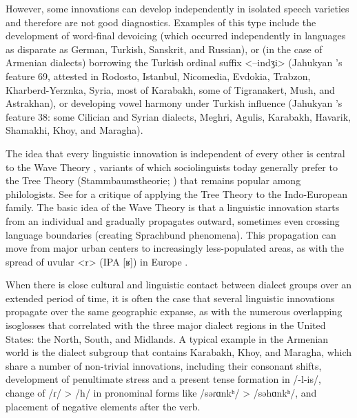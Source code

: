 \documentclass[output=paper]{langscibook}
\begin{document}
However, some innovations can develop independently in isolated speech varieties and therefore are not good diagnostics. Examples of this type include the development of word-final devoicing (which occurred independently in languages as disparate as German, Turkish, Sanskrit, and Russian), or (in the case of Armenian dialects) borrowing the Turkish ordinal suffix <–indʒi> (Jahukyan \citeyear{Jahukyan-1972-ArmenianDiaolectology}'s feature 69, attested in Rodosto, Istanbul, Nicomedia, Evdokia, Trabzon, Kharberd-Yerznka, Syria, most of Karabakh, some of Tigranakert, Mush, and Astrakhan), or developing vowel harmony under Turkish influence (Jahukyan \citeyear{Jahukyan-1972-ArmenianDiaolectology}'s feature 38: some Cilician and Syrian dialects, Meghri, Agulis, Karabakh, Havarik, Shamakhi, Khoy, and Maragha).

The idea that every linguistic innovation is independent of every other is central to the Wave Theory \citep{Schmidt-1872-VerwandtschaftsverhältnisseindogermanischenSprachen}, variants of which sociolinguists today generally prefer to the Tree Theory (Stammbaumstheorie; \citealt{Schleicher-1853-erstenSpaltungenindogermanischenUrvolkes}) that remains popular among philologists.  See \citealt{Garrett-2006-ConvergenceformationIndoEuropeansubgroupsPhylogenychronology} for a critique of applying the Tree Theory to the Indo-European family.  The basic idea of the Wave Theory is that a linguistic innovation starts from an individual and gradually propagates outward, sometimes even crossing language boundaries (creating Sprachbund phenomena).  This propagation can move from major urban centers to increasingly less-populated areas, as with the spread of uvular <r> (IPA [ʁ]) in Europe \citep{Trudgill-1974-Linguisticchangediffusiondescriptionexplanationsociolinguisticdialectgeography}.

When there is close cultural and linguistic contact between dialect groups over an extended period of time, it is often the case that several linguistic innovations propagate over the same geographic expanse, as with the numerous overlapping isoglosses that \citet{Kurath-1949-wordgeographyEasternUnitedStates} correlated with the three major dialect regions in the United States: the North, South, and Midlands. A typical example in the Armenian world is the dialect subgroup that contains Karabakh, Khoy, and Maragha, which share a number of non-trivial innovations, including their consonant shifts, development of penultimate stress and a present tense formation in /-l-is/, change of /ɾ/ > /h/ in pronominal forms like /səɾɑnkʰ/ > /səhɑnkʰ/, and placement of negative elements after the verb.
\end{document}
